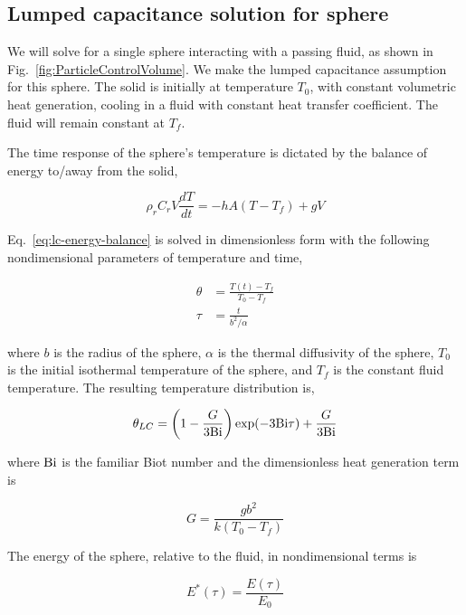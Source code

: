 \subsection{Lumped capacitance solution for sphere}\label{sec:lumped-capacitance}
We will solve for a single sphere interacting with a passing fluid, as shown in Fig.~\ref{fig:ParticleControlVolume}. We make the lumped capacitance assumption for this sphere. The solid is initially at temperature $T_0$, with constant volumetric heat generation, cooling in a fluid with constant heat transfer coefficient. The fluid will remain constant at $T_f$.

The time response of the sphere's temperature is dictated by the balance of energy to/away from the solid,  

\begin{equation}\label{eq:lc-energy-balance}
	\rho_rC_rV\frac{dT}{dt} = -hA(T-T_f) + gV
\end{equation}

Eq.~\ref{eq:lc-energy-balance} is solved in dimensionless form with the following nondimensional parameters of temperature and time,

\begin{align}
    \theta &= \frac{T(t) - T_f}{T_0 - T_f}\\
    \tau & = \frac{t}{b^2/\alpha}
\end{align}

where $b$ is the radius of the sphere, $\alpha$ is the thermal diffusivity of the sphere, $T_0$ is the initial isothermal temperature of the sphere, and $T_f$ is the constant fluid temperature. The resulting temperature distribution is,

\begin{equation}
\label{eq:theta-lc}
	\theta_{LC}=\left(1-\frac{G}{3\mathrm{Bi}}\right)\exp(-3\mathrm{Bi} \tau) + \frac{G}{3\mathrm{Bi}}
\end{equation}

where $\mathrm{Bi}$ is the familiar Biot number and the dimensionless heat generation term is 

\begin{equation}\label{eq:nondimensional-heat-generation}
	G = \frac{gb^2}{k(T_0 - T_f)}
\end{equation}

The energy of the sphere, relative to the fluid, in nondimensional terms is 

\begin{equation}
    E^*(\tau)=\frac{E(\tau)}{E_0}
\end{equation}

